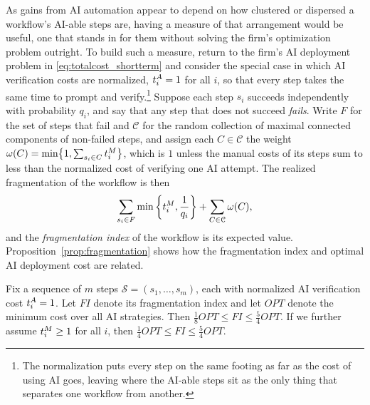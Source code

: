 As gains from AI automation appear to depend on how clustered or dispersed a workflow's AI-able steps are, having a measure of that arrangement would be useful, one that stands in for them without solving the firm's optimization problem outright.
To build such a measure, return to the firm's AI deployment problem in \eqref{eq:totalcost_shortterm} and consider the special case in which AI verification costs are normalized, $t^{A}_{i} = 1$ for all $i$, so that every step takes the same time to prompt and verify.\footnote{The normalization puts every step on the same footing as far as the cost of using AI goes, leaving where the AI-able steps sit as the only thing that separates one workflow from another.}
Suppose each step $s_i$ succeeds independently with probability $q_i$, and say that any step that does not succeed \emph{fails}.
Write $F$ for the set of steps that fail and $\mathcal{C}$ for the random collection of maximal connected components of non-failed steps, and assign each $C \in \mathcal{C}$ the weight $\omega(C) = \min\bigl\{ 1, \sum_{s_i \in C} t^{M}_{i} \bigr\}$, which is $1$ unless the manual costs of its steps sum to less than the normalized cost of verifying one AI attempt.
The realized fragmentation of the workflow is then
\begin{equation}
    \sum_{s_i \in F}\min\left\{t^{M}_{i}, \frac{1}{q_i}\right\} + \sum_{C \in \mathcal{C}} \omega(C),\label{eq:fragmentation}
\end{equation}
and the \emph{fragmentation index} of the workflow is its expected value.
Proposition~\ref{prop:fragmentation} shows how the fragmentation index and optimal AI deployment cost are related.

\begin{proposition}
\label{prop:fragmentation}
   Fix a sequence of $m$ steps $\mathcal{S} = (s_1, \dotsc, s_m)$, each with normalized AI verification cost $t^{A}_{i} = 1$.
   Let $FI$ denote its fragmentation index and let $OPT$ denote the minimum cost over all AI strategies.
   Then $\tfrac{1}{8}OPT \leq FI \leq \tfrac{5}{4}OPT$.
   If we further assume $t^{M}_{i} \geq 1$ for all $i$, then $\tfrac{1}{4}OPT \leq FI \leq \tfrac{5}{4}OPT$.
\end{proposition}

